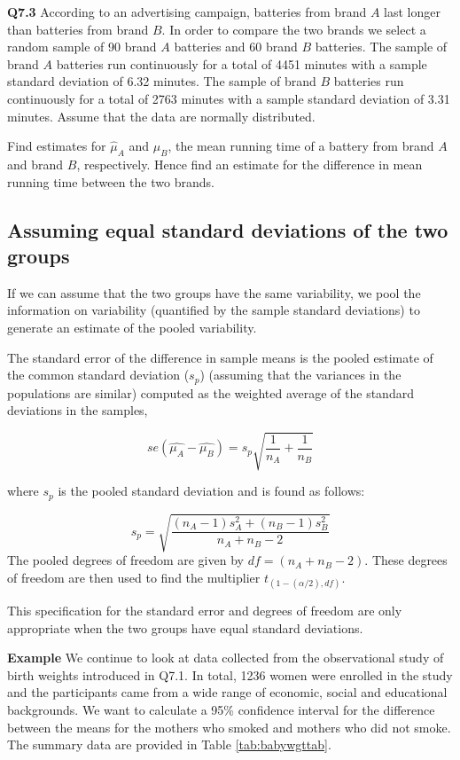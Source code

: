 \documentclass[
  oneside]{krantz}
\begin{document}
\textbf{Q7.3} According to an advertising campaign, batteries from brand \(A\) last longer than
batteries from brand \(B\). In order to compare the two brands we select a random sample of 90 brand \(A\) batteries and 60 brand \(B\) batteries. The sample of brand \(A\) batteries run continuously for a total of 4451 minutes with a sample standard deviation of 6.32 minutes. The sample of brand \(B\) batteries run continuously for a total of 2763 minutes with a sample standard deviation of 3.31 minutes. Assume that the data are normally distributed.

Find estimates for \(\hat \mu_A\) and \(\hat \mu_B\), the mean running time of a battery from brand \(A\) and brand \(B\), respectively. Hence find an estimate for the difference in mean running time between the two brands.

\hypertarget{assuming-equal-standard-deviations-of-the-two-groups}{%
\subsection{Assuming equal standard deviations of the two groups}\label{assuming-equal-standard-deviations-of-the-two-groups}}

If we can assume that the two groups have the same variability, we pool the information on variability (quantified by the sample standard deviations) to generate an estimate of the pooled variability.

The standard error of the difference in sample means is the pooled estimate of the common standard deviation (\(s_p\)) (assuming that the variances in the populations are similar) computed as the weighted average of the standard deviations in the samples,

\[se(\hat{\mu_A} - \hat{\mu_B})=s_p\sqrt{\frac{1}{n_A} + \frac{1}{n_B}}\]

where \(s_p\) is the pooled standard deviation and is found as follows:

\[ s_p = \sqrt{\frac{(n_A-1)s_A^2 + (n_B-1)s_B^2}{n_A + n_B -2}}\]
The pooled degrees of freedom are given by \(df=(n_A + n_B - 2)\). These degrees of freedom are then used to find the multiplier \(t_{(1-(\alpha/2), df)}\).

This specification for the standard error and degrees of freedom are only appropriate when the two groups have equal standard deviations.

\textbf{Example} We continue to look at data collected from the observational study of birth weights introduced in Q7.1. In total, 1236 women were enrolled in the study and the participants came from a wide range of economic, social and educational backgrounds. We want to calculate a 95\% confidence interval for the difference between the means for the mothers who smoked and mothers who did not smoke. The summary data are provided in Table \ref{tab:babywgttab}.
\end{document}
